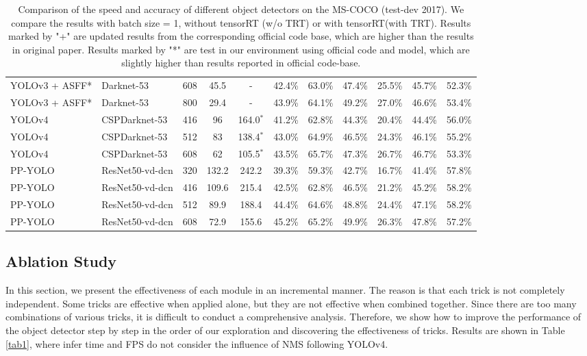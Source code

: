 \documentclass[10pt,twocolumn,letterpaper]{article}
\begin{document}
\begin{table*}[h]
{\begin{tabular}{l|l|c|cc|cccccc}
				YOLOv3 + ASFF* \cite{Liu2019Learning}& Darknet-53 & 608 &  45.5   & - &42.4\% & 63.0\% & 47.4\% & 25.5\% & 45.7\% & 52.3\% \\
				YOLOv3 + ASFF* \cite{Liu2019Learning} & Darknet-53 & 800 & 29.4   &- & 43.9\% & 64.1\% & 49.2\% & 27.0\% & 46.6\% & 53.4\% \\
				\hline
				YOLOv4 \cite{yolov4} & CSPDarknet-53 & 416 & 96  &164.0$^*$ & 41.2\% & 62.8\% & 44.3\% & 20.4\% & 44.4\% & 56.0\% \\
				YOLOv4  \cite{yolov4} & CSPDarknet-53 & 512 & 83  &138.4$^*$  & 43.0\% & 64.9\% & 46.5\% & 24.3\% & 46.1\% & 55.2\% \\
				YOLOv4  \cite{yolov4} & CSPDarknet-53 & 608  & 62  &105.5$^*$  & 43.5\% & 65.7\% & 47.3\% & 26.7\% & 46.7\% & 53.3\% \\
				\hline
				\hline
				PP-YOLO & ResNet50-vd-dcn & 320 & 132.2 &  242.2 & 39.3\% & 59.3\% & 42.7\% & 16.7\% & 41.4\% & 57.8\% \\
				PP-YOLO & ResNet50-vd-dcn & 416 & 109.6 & 215.4 & 42.5\% & 62.8\% & 46.5\% & 21.2\% & 45.2\% & 58.2\% \\
				PP-YOLO & ResNet50-vd-dcn & 512 & 89.9 & 188.4 & 44.4\%  & 64.6\% & 48.8\% & 24.4\% & 47.1\% & 58.2\% \\
				PP-YOLO& ResNet50-vd-dcn & 608 & 72.9 &  155.6 & 45.2\% & 65.2\% & 49.9\% & 26.3\% & 47.8\% & 57.2\% \\
				\hline
			\end{tabular}
		}
		\caption{Comparison of the speed and accuracy of different object detectors on the MS-COCO (test-dev 2017). We compare the results with batch size = 1, without tensorRT (w/o TRT) or with tensorRT(with TRT).
			Results marked by "+" are updated results from the corresponding official code base, which are higher than the results in original paper.
			Results marked by "*" are test in our environment using official code and model, which are slightly higher than results reported in official code-base.
		}
		\label{tab2}
	\end{table*}
	
	\subsection{Ablation Study}
	
	In this section, we present the effectiveness of each module in an incremental manner. The reason is that each trick is not completely independent. Some tricks are effective when applied alone, but they are not effective when combined together. Since there are too many combinations of various tricks, it is difficult to conduct a comprehensive analysis.
	Therefore, we show how to improve the performance of the object detector step by step in the order of our exploration and discovering the effectiveness of tricks. Results are shown in Table \ref{tab1}, where infer time and FPS do not consider the influence of NMS following YOLOv4\cite{yolov4}.
	
\end{document}
